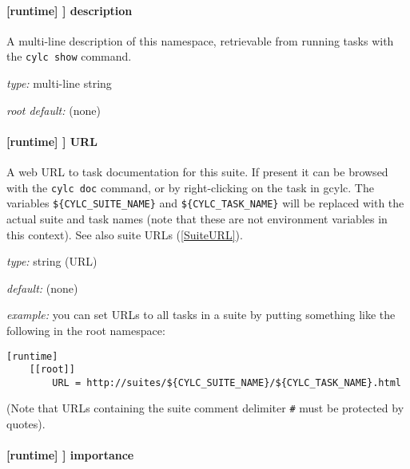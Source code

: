 \paragraph[description]{[runtime] \textrightarrow [[\_\_NAME\_\_]] \textrightarrow description}

A multi-line description of this namespace, retrievable from running tasks with the
\lstinline=cylc show= command.

\begin{myitemize}
\item {\em type:} multi-line string
\item {\em root default:} (none)
\end{myitemize}

\paragraph[URL]{[runtime] \textrightarrow [[\_\_NAME\_\_]] \textrightarrow URL}
\label{TaskURL}

A web URL to task documentation for this suite.  If present it can be browsed
with the \lstinline=cylc doc= command, or by right-clicking on the task in
gcylc.  The variables \lstinline=${CYLC_SUITE_NAME}= and
\lstinline=${CYLC_TASK_NAME}= will be replaced with the actual suite and task
names (note that these are not environment variables in this context). See also
suite URLs (\ref{SuiteURL}).

\begin{myitemize}
\item {\em type:} string (URL)
\item {\em default:} (none)
\item {\em example:} you can set URLs to all tasks in a suite by putting
    something like the following in the root namespace:
    \begin{lstlisting}
[runtime]
    [[root]]
        URL = http://suites/${CYLC_SUITE_NAME}/${CYLC_TASK_NAME}.html
    \end{lstlisting}
\end{myitemize}

(Note that URLs containing the suite comment delimiter
\lstinline=#= must be protected by quotes).

\paragraph[importance]{[runtime] \textrightarrow [[\_\_NAME\_\_]] \textrightarrow importance}


